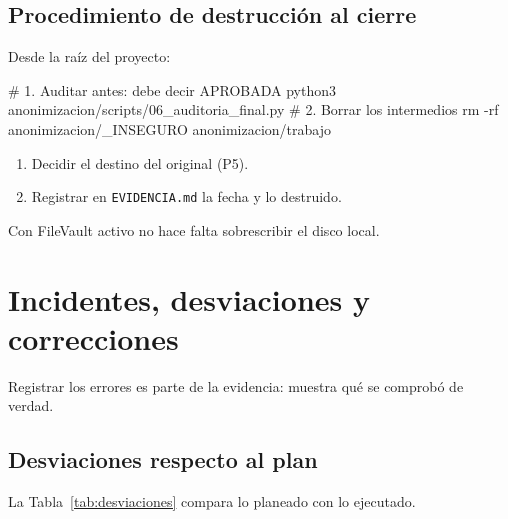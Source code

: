 \documentclass[11pt,a4paper,twoside,twocolumn]{article}
\newcommand{\cod}[1]{\nolinkurl{#1}}
\begin{document}
\subsection{Procedimiento de destrucción al cierre}

Desde la raíz del proyecto:

\begin{codigo}[]
# 1. Auditar antes: debe decir APROBADA
python3 anonimizacion/scripts/06_auditoria_final.py
# 2. Borrar los intermedios
rm -rf anonimizacion/_INSEGURO anonimizacion/trabajo
\end{codigo}

\begin{enumerate}[leftmargin=*,itemsep=2pt,topsep=0pt,start=3]
  \item Decidir el destino del original (P5).
  \item Registrar en \cod{EVIDENCIA.md} la fecha y lo destruido.
\end{enumerate}

Con FileVault activo no hace falta sobrescribir el disco local.

\section{Incidentes, desviaciones y correcciones}\label{sec:incidentes}

Registrar los errores es parte de la evidencia: muestra qué se comprobó de verdad.

\subsection{Desviaciones respecto al plan}\label{sec:desviaciones}

La Tabla~\ref{tab:desviaciones} compara lo planeado con lo ejecutado.
\end{document}
